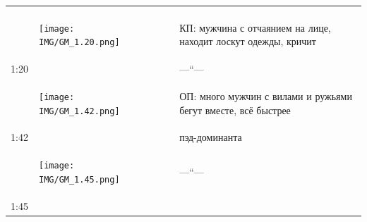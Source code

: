 \begin{longtable}[]{@{}ll@{}}
\begin{minipage}[t]{0.55\columnwidth}
\end{minipage}\tabularnewline
\begin{minipage}[t]{0.30\columnwidth}\raggedright\strut
\begin{figure}
\centering
\texttt{[image: IMG/GM\_1.20.png]}
\caption{}
\end{figure}
\strut
\end{minipage} & \begin{minipage}[t]{0.55\columnwidth}\raggedright\strut
КП: мужчина с отчаянием на лице,
находит лоскут одежды, кричит\strut
\end{minipage}\tabularnewline
\begin{minipage}[t]{0.30\columnwidth}\raggedright\strut
1:20\strut
\end{minipage} & \begin{minipage}[t]{0.55\columnwidth}\raggedright\strut
---``---\strut
\end{minipage}\tabularnewline
\begin{minipage}[t]{0.30\columnwidth}\raggedright\strut
\begin{figure}
\centering
\texttt{[image: IMG/GM\_1.42.png]}
\caption{}
\end{figure}
\strut
\end{minipage} & \begin{minipage}[t]{0.55\columnwidth}\raggedright\strut
ОП: много мужчин с вилами и ружьями
бегут вместе, всё быстрее\strut
\end{minipage}\tabularnewline
\begin{minipage}[t]{0.30\columnwidth}\raggedright\strut
1:42\strut
\end{minipage} & \begin{minipage}[t]{0.55\columnwidth}\raggedright\strut
пэд-доминанта\strut
\end{minipage}\tabularnewline
\begin{minipage}[t]{0.30\columnwidth}\raggedright\strut
\begin{figure}
\centering
\texttt{[image: IMG/GM\_1.45.png]}
\caption{}
\end{figure}
\strut
\end{minipage} & \begin{minipage}[t]{0.55\columnwidth}\raggedright\strut
---``---\strut
\end{minipage}\tabularnewline
\begin{minipage}[t]{0.30\columnwidth}\raggedright\strut
1:45\strut
\end{minipage} & \begin{minipage}[t]{0.55\columnwidth}\raggedright\strut

\end{minipage}
\end{longtable}
